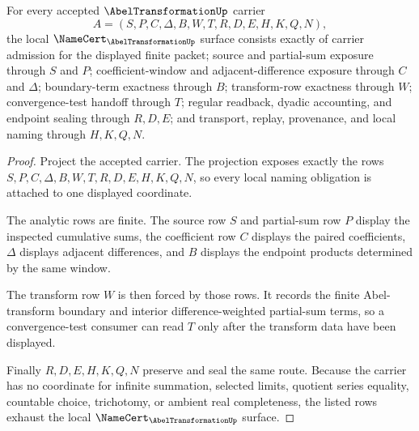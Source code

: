 \begin{theorem}
\label{thm:abel-transformation-namecert-obligations}
For every accepted $\AbelTransformationUp$ carrier
$$
A=(S,P,C,\Delta,B,W,T,R,D,E,H,K,Q,N),
$$
the local $\NameCert_{\AbelTransformationUp}$ surface consists exactly of carrier admission for the displayed finite packet; source and partial-sum exposure through $S$ and $P$; coefficient-window and adjacent-difference exposure through $C$ and $\Delta$; boundary-term exactness through $B$; transform-row exactness through $W$; convergence-test handoff through $T$; regular readback, dyadic accounting, and endpoint sealing through $R,D,E$; and transport, replay, provenance, and local naming through $H,K,Q,N$.
\end{theorem}
\begin{proof}
Project the accepted carrier. The projection exposes exactly the rows $S,P,C,\Delta,B,W,T,R,D,E,H,K,Q,N$, so every local naming obligation is attached to one displayed coordinate.

The analytic rows are finite. The source row $S$ and partial-sum row $P$ display the inspected cumulative sums, the coefficient row $C$ displays the paired coefficients, $\Delta$ displays adjacent differences, and $B$ displays the endpoint products determined by the same window.

The transform row $W$ is then forced by those rows. It records the finite Abel-transform boundary and interior difference-weighted partial-sum terms, so a convergence-test consumer can read $T$ only after the transform data have been displayed.

Finally $R,D,E,H,K,Q,N$ preserve and seal the same route. Because the carrier has no coordinate for infinite summation, selected limits, quotient series equality, countable choice, trichotomy, or ambient real completeness, the listed rows exhaust the local $\NameCert_{\AbelTransformationUp}$ surface.
\end{proof}

